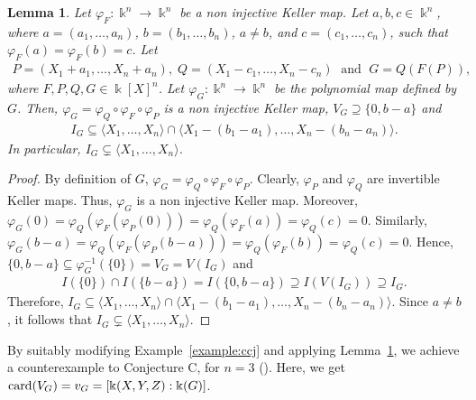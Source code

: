 \documentclass[11pt,reqno]{amsart}
\newtheorem{lemma}[theorem]{Lemma}
\theoremstyle{definition}
\newcommand{\mbk}{\mbox{$\Bbbk$}}
\newcommand{\card}{\mbox{${\rm card}$}}
\begin{document}
\begin{lemma}\label{lem:notinjective}
Let $\varphi_F:\mbk^n\to\mbk^n$ be a non injective Keller map. 
Let $a,b,c\in\mbk^n$, where $a=(a_1,\ldots,a_n)$, $b=(b_1,\ldots,b_n)$, $a\neq b$, 
and $c=(c_1,\ldots,c_n)$, such that $\varphi_F(a)=\varphi_F(b)=c$.
Let 
\begin{eqnarray*}
P=(X_1+a_1,\ldots,X_n+a_n),\; Q=(X_1-c_1,\ldots,X_n-c_n)\;\mbox{ and }\; G=Q(F(P)),
\end{eqnarray*}
where $F,P,Q,G\in\mbk[X]^n$. Let $\varphi_G:\mbk^n\to \mbk^n$ be the polynomial map defined by $G$. 
Then, $\varphi_G=\varphi_Q\circ\varphi_F\circ\varphi_P$ is a non injective Keller map, 
$V_G\supseteq \{0,b-a\}$ and
\begin{eqnarray*}
I_G\subseteq\langle X_1,\ldots,X_n\rangle\cap
\langle X_1-(b_1-a_1),\ldots,X_n-(b_n-a_n)\rangle.
\end{eqnarray*}
In particular, $I_G\subsetneq \langle X_1,\ldots,X_n\rangle$.
\end{lemma}
\begin{proof}
By definition of $G$, $\varphi_G=\varphi_Q\circ\varphi_F\circ\varphi_P$.
Clearly, $\varphi_P$ and $\varphi_Q$ are invertible Keller maps.
Thus, $\varphi_G$ is a non injective Keller map. Moreover, 
$\varphi_G(0)=\varphi_Q(\varphi_F(\varphi_P(0)))=\varphi_Q(\varphi_F(a))=\varphi_Q(c)=0$. 
Similarly, $\varphi_G(b-a)=
\varphi_Q(\varphi_F(\varphi_P(b-a)))=\varphi_Q(\varphi_F(b))=\varphi_Q(c)=0$. Hence, 
$\{0,b-a\}\subseteq\varphi_G^{-1}(\{0\})=V_G=V(I_G)$ and 
\begin{eqnarray*}
I(\{0\})\cap I(\{b-a\})=I(\{0,b-a\})\supseteq I(V(I_G))\supseteq I_G.
\end{eqnarray*}
Therefore, $I_G\subseteq \langle X_1,\ldots,X_n\rangle\cap 
\langle X_1-(b_1-a_1),\ldots,X_n-(b_n-a_n)\rangle$.
Since $a\neq b$, it follows that $I_G\subsetneq \langle X_1,\ldots,X_n\rangle$.
\end{proof}

By suitably modifying Example~\ref{example:ccj} and applying Lemma~\ref{lem:notinjective}, 
we achieve a counterexample to Conjecture C, for $n=3$ (\cite[Conjecture C]{mn}). 
Here, we get $\card(V_G)=v_G=[\mbk(X,Y,Z):\mbk(G)]$. 
\end{document}
